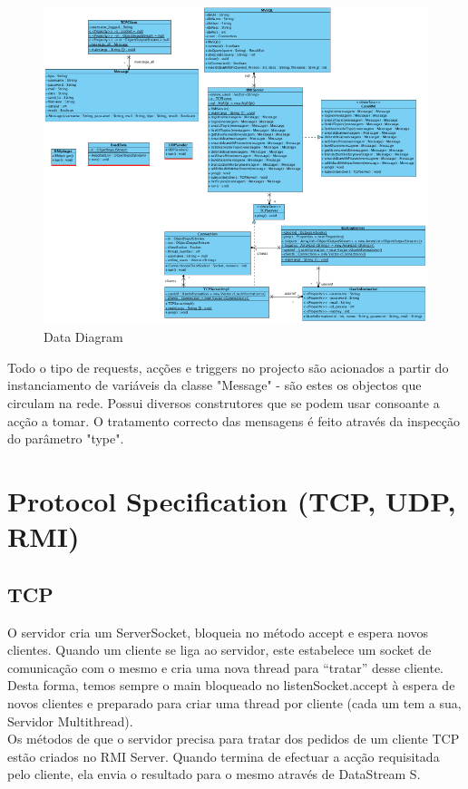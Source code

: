 \documentclass[12pt]{article} %
\begin{document}
\begin{figure}[!ht]
  	\centering
  	\includegraphics[scale=0.6]{ClassDiagram.png}
  	\caption{Data Diagram}
	\label{figure4}
\end{figure}

Todo o tipo de requests, acções e triggers no projecto são acionados a partir do instanciamento de variáveis da classe "Message" - são estes os objectos que circulam na rede. Possui diversos construtores que se podem usar consoante a acção a tomar. O tratamento correcto das mensagens é feito através da inspecção do parâmetro "type".





\section{Protocol Specification (TCP, UDP, RMI)} %
\label{sec:protocal_specs}

\subsection{TCP}
O servidor cria um ServerSocket, bloqueia no método accept e espera novos clientes. Quando um cliente se liga ao servidor, este estabelece um socket de comunicação com o mesmo e cria uma nova thread para “tratar” desse cliente. Desta forma, temos sempre o main bloqueado no listenSocket.accept à espera de novos clientes e preparado para criar uma thread por cliente (cada um tem a sua, Servidor Multithread).\\
Os métodos de que o servidor precisa para tratar dos pedidos de um cliente TCP estão criados no RMI Server. Quando termina de efectuar a acção requisitada pelo cliente, ela envia o resultado para o mesmo através de DataStream S.
\end{document}
